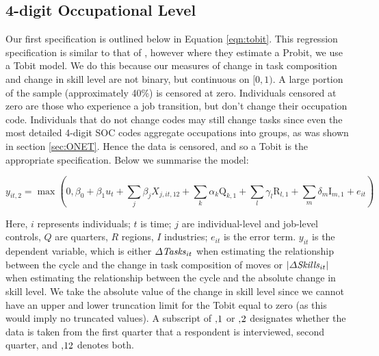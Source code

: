 \documentclass[11pt, oneside]{article}
\begin{document}
\subsection{4-digit Occupational Level}
\label{sec:4digit}
Our first specification is outlined below in Equation \ref{eqn:tobit}. This regression specification is similar to that of \cite{Carrillo-Tudela2016}, however where they estimate a Probit, we use a Tobit model. We do this because our measures of change in task composition and change in skill level are not binary, but continuous on $[0,1)$. A large portion of the sample (approximately 40\%) is censored at zero. Individuals censored at zero are those who experience a job transition, but don't change their occupation code. Individuals that do not change codes may still change tasks since even the most detailed 4-digit SOC codes aggregate occupations into groups, as was shown in section \ref{sec:ONET}. Hence the data is censored, and so a Tobit is the appropriate specification. Below we summarise the model:

\begin{equation}
\label{eqn:tobit}
y_{it,2} =\max(0,\beta_0 + \beta_{1}u_{t} + \sum_{j} \beta_{j}X_{j,it,12} + \sum_{k} \alpha_{k} \text{Q}_{k,1} + \sum_{l} \gamma_{l} \text{R}_{l,1} + \sum_{m} \delta_{m} \text{I}_{m,1}+ e_{it})
\end{equation}

\noindent Here, $i$ represents individuals; $t$ is time; $j$ are individual-level and job-level controls, $Q$ are quarters, $R$ regions, $I$ industries; $e_{it}$ is the error term. $y_{it}$ is the dependent variable, which is either $\Delta\text{\textit{Tasks}}_{it}$ when estimating the relationship between the cycle and the change in task composition of moves or $|\Delta\text{\textit{Skills}}_{it}|$ when estimating the relationship between the cycle and the absolute change in skill level. We take the absolute value of the change in skill level since we cannot have an upper and lower truncation limit for the Tobit equal to zero (as this would imply no truncated values). A subscript of $,\hspace{-0.5mm}1$ or $,\hspace{-0.5mm}2$ designates whether the data is taken from the first quarter that a respondent is interviewed, second quarter, and $,\hspace{-0.5mm}12$ denotes both.

\vspace{2mm}
\end{document}
